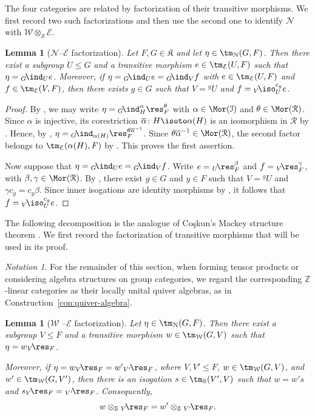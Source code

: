 \documentclass{amsart}
\numberwithin{equation}{section}%
\newtheorem{Lem}[equation]{Lemma}
\theoremstyle{remark}
\newtheorem{Not}[equation]{Notation}
\theoremstyle{definition}
\newcommand{\e}{\mathcal E}
\newcommand{\w}{\mathcal W}
\newcommand{\lind}[1]{{}_{#1}\!\ind}
\newcommand{\lres}[1]{{}_{#1}\!\res}
\newcommand{\liso}[1]{{}_{#1}\!\iso}
\newcommand{\ol}[1]{\overline{#1}}
\begin{document}
The four categories are related by factorization of their transitive
morphisms. We first record two such factorizations and then use the
second one to identify $\mathcal N$ with
$\mathcal W\otimes_{\mathcal S}\mathcal E$.
%
\begin{Lem}[$\mathcal N$--$\mathcal E$ factorization]
\label{lem:N-E-factorization}
Let $F,G\in\mathfrak K$ and let
$\eta\in\tm_{\mathcal N}(G,F)$.
Then there exist a subgroup $U\leq G$ and a transitive morphism
$e\in\tm_{\mathcal E}(U,F)$ such that
$\eta=\lind{G}_Ue$.
Moreover, if
$\eta
=
\lind{G}_Ue
=
\lind{G}_Vf$
with
$e\in\tm_{\mathcal E}(U,F)$ and
$f\in\tm_{\mathcal E}(V,F)$,
then there exists $g\in G$ such that
$V={}^gU$ and $f=
\liso{V}_U^{c_g}e$.
\end{Lem}
%
\begin{proof}
By , we may write
$\eta=\lind{G}_H^\alpha\res_F^\theta$
with
$\alpha\in\Mor(\mathcal I)$ and
$\theta\in\Mor(\mathcal R)$.
Since $\alpha$ is injective, its corestriction
$\ol{\alpha}\colon H\isoto\alpha(H)$
is an isomorphism in $\mathcal R$ by .
Hence, by ,
$\eta
=
\lind{G}_{\alpha(H)}
\res_F^{\theta\ol{\alpha}^{-1}}$. 
Since $\theta\ol{\alpha}^{-1}\in\Mor(\mathcal R)$, the second factor
belongs to $\tm_{\mathcal E}(\alpha(H),F)$ by
. This proves the first assertion.

Now suppose that
$\eta=\lind{G}_Ue=\lind{G}_Vf$.
Write $e=\lres{U}_F^\beta$ and
$f=\lres{V}_F^\gamma$, with
$\beta,\gamma\in\Mor(\mathcal R)$.
By ,
there exist $g\in G$ and $y\in F$ such that
$V={}^gU$ and $\gamma c_g=c_y\beta$.
Since inner isogations are identity morphisms by
, it follows that
$f=\liso{V}_U^{c_g}e$.
\end{proof}
%
The following decomposition is the analogue of
Co\c{s}kun's Mackey structure theorem
\cite[Thm.~3.2]{Coskun07}. We first record the factorization
of transitive morphisms that will be used in its proof.
%
\begin{Not}
\label{not:WE-quiver-algebras}
For the remainder of this section, when forming tensor products
or considering algebra structures on group categories, we regard
the corresponding $\mathbb Z$-linear categories as their locally
unital quiver algebras, as in
Construction~\ref{con:quiver-algebra}.
\end{Not}
%
\begin{Lem}[$\w$ --$\e$ factorization]
\label{lem:N-WE-factorization}
Let $\eta\in\tm_{\mathcal N}(G,F)$. Then there exist a subgroup
$V\leq F$ and a transitive morphism
$w\in\tm_{\mathcal W}(G,V)$ such that
$\eta=w\lres{V}_F$.

Moreover, if
$\eta
=
w\lres{V}_F
=
w'\lres{V'}_F$,
where $V,V'\leq F$,
$w\in\tm_{\mathcal W}(G,V)$, and
$w'\in\tm_{\mathcal W}(G,V')$,
then there is an isogation
$s\in\tm_{\mathcal S}(V',V)$
such that
$w=w's$ and
$s\lres{V}_F=\lres{V'}_F$.
Consequently,
%
\[
w\otimes_{\mathcal S}\lres{V}_F
=
w'\otimes_{\mathcal S}\lres{V'}_F.
\]
\end{Lem}
\end{document}

